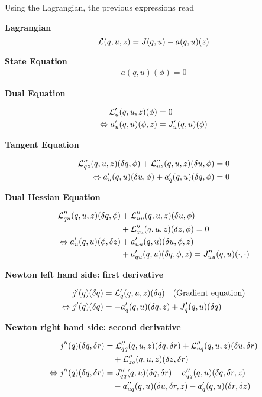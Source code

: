 Using the Lagrangian, the previous expressions read


\textbf{Lagrangian}
\begin{equation*}
{\cal L}(q,u,z) =J(q,u) - a(q,u)(z)
\end{equation*}

\textbf{State Equation}
\begin{align*}
a(q,u)(\phi) = 0 
\end{align*}


\textbf{Dual Equation}

\begin{align*}
{\cal L}_{u}' (q,u,z)(\phi ) &= 0 \\
\Leftrightarrow a_u' (q,u)(\phi,z) &= J_u' (q,u)(\phi)
\end{align*}

\textbf{Tangent Equation}

\begin{align*}
{\cal L}_{qz}'' (q,u,z)(\delta q, \phi) 
+ {\cal L}_{uz}'' (q,u,z)(\delta u, \phi) &= 0 \\
\Leftrightarrow a_u' (q,u)(\delta u,\phi) + a_q' (q,u)(\delta q,\phi) &= 0
\end{align*}

\textbf{Dual Hessian Equation}

\begin{align*}
{\cal L}_{qu}'' (q,u,z)(\delta q, \phi) 
&+ {\cal L}_{uu}'' (q,u,z)(\delta u, \phi) \\
&+ {\cal L}_{zu}'' (q,u,z)(\delta z, \phi) = 0 \\
\Leftrightarrow a_u' (q,u)(\phi, \delta z) 
&+ a_{uu}' (q,u)(\delta u,\phi, z) \\
&+ a_{qu}' (q,u)(\delta q,\phi, z)  = J_{uu}''(q,u)(\cdot ,\cdot )
\end{align*}

\textbf{Newton left hand side: first derivative}

\begin{align*}
j'(q)(\delta q) &= {\cal L}_{q}' (q,u,z)(\delta q) \quad\text{(Gradient equation)} \\
\Leftrightarrow j'(q)(\delta q) &= -a_q' (q,u)(\delta q,z) + J_{q}'(q,u)(\delta q)
\end{align*}

\textbf{Newton right hand side: second derivative}

\begin{align*}
j''(q)(\delta q, \delta r) &= {\cal L}_{qq}'' (q,u,z)(\delta q, \delta r) + 
{\cal L}_{uq}'' (q,u,z)(\delta u, \delta r) \\
&\quad +  {\cal L}_{zq}'' (q,u,z)(\delta z, \delta r) \\
\Leftrightarrow  j''(q)(\delta q, \delta r) &= 
J_{qq}''(q,u)(\delta q, \delta r) -a_{qq}'' (q,u)(\delta q,\delta r, z) \\
&\quad - a_{uq}'' (q,u)(\delta u,\delta r, z) -a_{q}' (q,u)(\delta r,\delta z)  
\end{align*}


